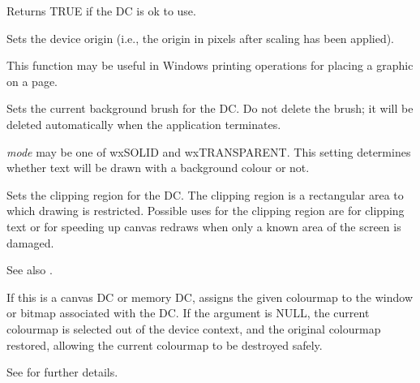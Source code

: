 Returns TRUE if the DC is ok to use.

\label{wxdcsetdeviceorigin}


Sets the device origin (i.e., the origin in pixels after scaling has been
applied).

This function may be useful in Windows printing
operations for placing a graphic on a page.

\label{wxdcsetbackground}


Sets the current background brush for the DC.  Do not delete the
brush; it will be deleted automatically when the application
terminates.

\label{wxdcsetbackgroundmode}


{\it mode} may be one of wxSOLID and wxTRANSPARENT. This setting determines
whether text will be drawn with a background colour or not.

\label{wxdcsetclippingregion}


Sets the clipping region for the DC. The clipping region is a rectangular area
to which drawing is restricted.  Possible uses for the clipping region are for clipping text
or for speeding up canvas redraws when only a known area of the screen is damaged.

See also .

\label{wxdcsetcolourmap}


If this is a canvas DC or memory DC, assigns the given colourmap to the window
or bitmap associated with the DC. If the argument is NULL, the current
colourmap is selected out of the device context, and the original colourmap
restored, allowing the current colourmap to be destroyed safely.

See  for further details.

